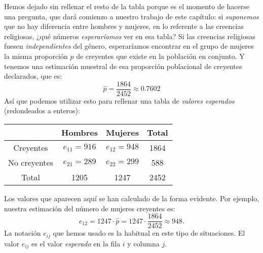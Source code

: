 \begin{itemize}
        Hemos dejado sin rellenar el resto de la tabla porque es el momento de hacerse una pregunta, que dará comienzo a nuestro trabajo de este capítulo: si {\em suponemos} que no hay diferencia entre hombres y mujeres, en lo referente a las creencias religiosas, ¿qué números {\em esperaríamos} ver en esa tabla? Si las creencias religiosas fuesen {\em independientes} del género, esperaríamos encontrar en el grupo de mujeres la misma proporción $p$ de creyentes que existe en la población en conjunto. Y tenemos una estimación muestral de esa proporción poblacional de creyentes declarados, que es:
        \[\hat p=\dfrac{1864}{2452}\approx 0.7602\]
        Así que podemos utilizar esto para rellenar una tabla de {\em valores esperados} (redondeados a enteros):
        \begin{center}
        \begin{tabular}{|c|c|c|c|}
          \hline
           & Hombres & Mujeres & Total \\
           \hline
          Creyentes & $e_{11}=916$ & $e_{12}=948$ & 1864 \\
          \hline
          No creyentes & $e_{21}=289$ & $e_{22}=299$ & 588 \\
          \hline
          Total & 1205 & 1247 & 2452 \\
          \hline
        \end{tabular}
        \end{center}
        Los valores que aparecen aquí se han calculado de la forma evidente. Por ejemplo, nuestra estimación del número de mujeres creyentes es:
        \[e_{12}=1247\cdot\hat p=1247\cdot\dfrac{1864}{2452}\approx 948.\]
        La notación $e_{ij}$ que hemos usado es la habitual en este tipo de situaciones. El valor $e_{ij}$ es el valor {\em esperado} en la fila $i$ y columna $j$.



\end{itemize}
